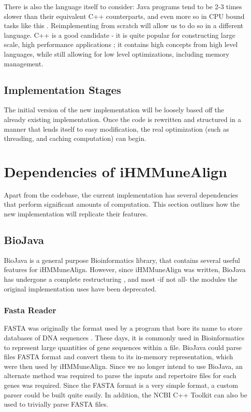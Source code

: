 There is also the language itself to consider: Java programs tend to be 2-3 times slower than their equivalent C++ counterparts, and even more so in CPU bound tasks like this \autocite{qtvjava}. Reimplementing from scratch will allow us to do so in a different language. C++ is a good candidate - it is quite popular for constructing large scale, high performance applications \autocite{cpp}; it contains high concepts from high level languages, while still allowing for low level optimizations, including memory management.

\subsection{Implementation Stages}
The initial version of the new implementation will be loosely based off the already existing implementation. Once the code is rewritten and structured in a manner that lends itself to easy modification, the real optimization (such as threading, and caching computation) can begin.

\section{Dependencies of iHMMuneAlign}
Apart from the codebase, the current implementation has several dependencies that perform significant amounts of computation. This section outlines how the new implementation will replicate their features.

\subsection{BioJava}
BioJava \autocite{biojava}is a general purpose Bioinformatics library, that contains several useful features for iHMMuneAlign. However, since iHMMuneAlign was written, BioJava has undergone a complete restructuring \autocite{biojava3}, and most -if not all- the modules the original implementation uses have been deprecated.

\subsubsection{Fasta Reader}
FASTA was originally the format used by a program that bore its name to store databases of DNA sequences \autocite{fasta}. These days, it is commonly used in Bioinformatics to represent large quantities of gene sequences within a file. BioJava could parse files FASTA format and convert them to its in-memory representation, which were then used by iHMMuneAlign. Since we no longer intend to use BioJava, an alternate method was required to parse the inputs and repertoire files for each genes was required. Since the FASTA format is a very simple format, a custom parser could be built quite easily. In addition, the NCBI C++ Toolkit can also be used to trivially parse FASTA files.

